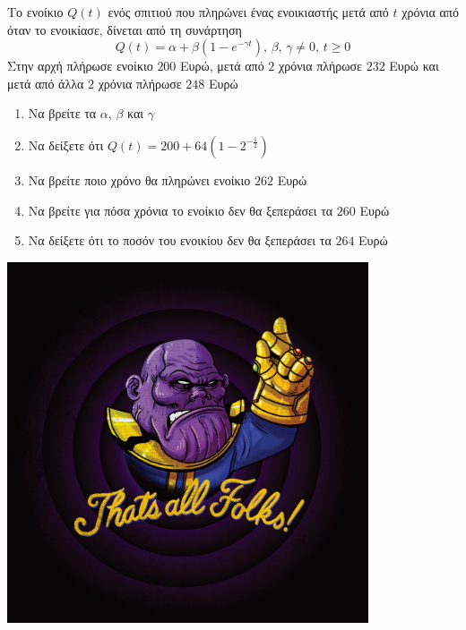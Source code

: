 \documentclass{../presentation}
\begin{document}
\begin{askisi}
  Το ενοίκιο $Q(t)$ ενός σπιτιού που πληρώνει ένας ενοικιαστής μετά από $t$ χρόνια από όταν το ενοικίασε, δίνεται από τη συνάρτηση
  $$Q(t)=α+β(1-e^{-γt}) \text{, } β \text{, } γ\ne 0\text{, } t\ge 0$$
  Στην αρχή πλήρωσε ενοίκιο $200$ Ευρώ, μετά από $2$ χρόνια πλήρωσε $232$ Ευρώ και μετά από άλλα $2$ χρόνια πλήρωσε $248$ Ευρώ
  \begin{enumerate}
    \item<1-> Να βρείτε τα $α$, $β$ και $γ$
    \item<2-> Να δείξετε ότι $Q(t)=200+64\left( 1-2^{-\frac{1}{2}} \right) $
    \item<3-> Να βρείτε ποιο χρόνο θα πληρώνει ενοίκιο $262$ Ευρώ
    \item<4-> Να βρείτε για πόσα χρόνια το ενοίκιο δεν θα ξεπεράσει τα $260$ Ευρώ
    \item<5-> Να δείξετε ότι το ποσόν του ενοικίου δεν θα ξεπεράσει τα $264$ Ευρώ
  \end{enumerate}


\end{askisi}

\begin{frame}
  \centering
  \includegraphics[width=0.8\textwidth]{"./images/thatsall.png"}

\end{frame}

\appendix

\section{}
\end{document}

